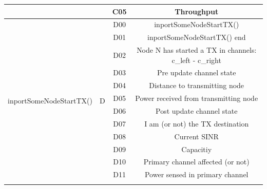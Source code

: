 \documentclass[a4paper]{article}
\begin{document}
\begin{table}[]
\begin{tabular}{|c|c|c|c|}
		                                           &                     & C05               & Throughput                                              \\ \hline
		\multirow{14}{*}{inportSomeNodeStartTX()}  & \multirow{14}{*}{D} & D00               & inportSomeNodeStartTX()                                 \\ \cline{3-4} 
		                                           &                     & D01               & inportSomeNodeStartTX() end                             \\ \cline{3-4} 
		                                           &                     & D02               & Node N has started a TX in channels: c\_left - c\_right \\ \cline{3-4} 
		                                           &                     & D03               & Pre update channel state                                \\ \cline{3-4} 
		                                           &                     & D04               & Distance to transmitting node                           \\ \cline{3-4} 
		                                           &                     & D05               & Power received from transmitting node                   \\ \cline{3-4} 
		                                           &                     & D06               & Post update channel state                               \\ \cline{3-4} 
		                                           &                     & D07               & I am (or not) the TX destination                        \\ \cline{3-4} 
		                                           &                     & D08               & Current SINR                                            \\ \cline{3-4} 
		                                           &                     & D09               & Capacitiy                                               \\ \cline{3-4} 
		                                           &                     & D10               & Primary channel affected (or not)                       \\ \cline{3-4} 
		                                           &                     & D11               & Power sensed in primary channel                         \\ \cline{3-4} 

\end{tabular}
\end{table}
\end{document}
